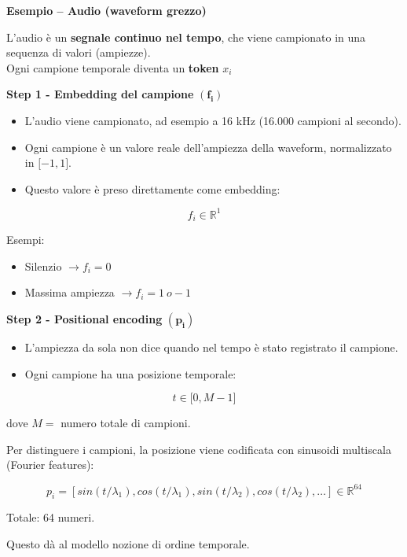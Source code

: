 \documentclass[
  11pt,
]{article}
\begin{document}
\textbf{Esempio -- Audio (waveform grezzo)}

L'audio è un \textbf{segnale continuo nel tempo}, che viene campionato
in una sequenza di valori (ampiezze).\\
Ogni campione temporale diventa un \textbf{token} \(x_{i}\)

\textbf{Step 1 - Embedding del campione}
\(\left( \mathbf{f}_{\mathbf{i}} \right)\)

\begin{itemize}
\item
  L'audio viene campionato, ad esempio a 16 kHz (16.000
  campioni al secondo).
\item
  Ogni campione è un valore reale dell'ampiezza della
  waveform, normalizzato in \(\lbrack - 1,1\rbrack\).
\item
  Questo valore è preso direttamente come embedding:
\end{itemize}

\[f_{i} \in \mathbb{R}^{1}\]

Esempi:

\begin{itemize}
\item
  Silenzio \(\rightarrow f_{i} = 0\)
\item
  Massima ampiezza \(\rightarrow f_{i} = 1\ o - 1\)
\end{itemize}

\textbf{Step 2 - Positional encoding}
\(\left( \mathbf{p}_{\mathbf{i}} \right)\)

\begin{itemize}
\item
  L'ampiezza da sola non dice quando nel tempo è stato
  registrato il campione.
\item
  Ogni campione ha una posizione temporale:
\end{itemize}

\[t \in \lbrack 0,M - 1\rbrack\]

dove \(M =\) numero totale di campioni.

Per distinguere i campioni, la posizione viene codificata con sinusoidi
multiscala (Fourier features):

\[p_{i} = \left\lbrack sin\left( t/\lambda_{1} \right),cos\left( t/\lambda_{1} \right),sin\left( t/\lambda_{2} \right),cos\left( t/\lambda_{2} \right),\ldots \right\rbrack \in \mathbb{R}^{64}\]

Totale: 64 numeri.


Questo dà al modello nozione di ordine temporale.
\end{document}
